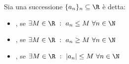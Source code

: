 \documentclass[../appunti.tex]{subfiles}
\begin{document}


\begin{eser}



\end{eser}





\begin{defn}
Sia una successione $ \{ a_n \}_n \subseteq \R $ è detta:

\begin{itemize}
	\item {}, se 
		$ \exists M \in \R\ :\ a_n \leq M\ \forall n \in \N $
	\item {}, se
		$ \exists M \in \R\ :\ a_n \geq M\ \forall n \in \N $
	\item {}, se 
		$ \exists M \in \R\ :\ | a_n | \leq M\ \forall n \in \N $ 
\end{itemize}
\end{defn}
\end{document}
